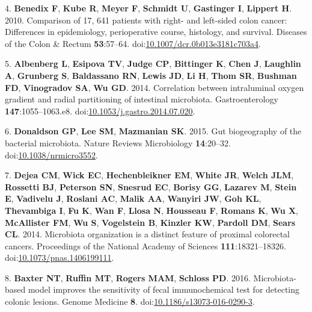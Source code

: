 \documentclass[11pt,]{article}
\begin{document}
\hypertarget{ref-Benedix2010}{}
4. \textbf{Benedix F}, \textbf{Kube R}, \textbf{Meyer F},
\textbf{Schmidt U}, \textbf{Gastinger I}, \textbf{Lippert H}. 2010.
Comparison of 17, 641 patients with right- and left-sided colon cancer:
Differences in epidemiology, perioperative course, histology, and
survival. Diseases of the Colon \& Rectum \textbf{53}:57--64.
doi:\href{https://doi.org/10.1007/dcr.0b013e3181c703a4}{10.1007/dcr.0b013e3181c703a4}.

\hypertarget{ref-Albenberg2014}{}
5. \textbf{Albenberg L}, \textbf{Esipova TV}, \textbf{Judge CP},
\textbf{Bittinger K}, \textbf{Chen J}, \textbf{Laughlin A},
\textbf{Grunberg S}, \textbf{Baldassano RN}, \textbf{Lewis JD},
\textbf{Li H}, \textbf{Thom SR}, \textbf{Bushman FD}, \textbf{Vinogradov
SA}, \textbf{Wu GD}. 2014. Correlation between intraluminal oxygen
gradient and radial partitioning of intestinal microbiota.
Gastroenterology \textbf{147}:1055--1063.e8.
doi:\href{https://doi.org/10.1053/j.gastro.2014.07.020}{10.1053/j.gastro.2014.07.020}.

\hypertarget{ref-Donaldson2015}{}
6. \textbf{Donaldson GP}, \textbf{Lee SM}, \textbf{Mazmanian SK}. 2015.
Gut biogeography of the bacterial microbiota. Nature Reviews
Microbiology \textbf{14}:20--32.
doi:\href{https://doi.org/10.1038/nrmicro3552}{10.1038/nrmicro3552}.

\hypertarget{ref-Dejea2014}{}
7. \textbf{Dejea CM}, \textbf{Wick EC}, \textbf{Hechenbleikner EM},
\textbf{White JR}, \textbf{Welch JLM}, \textbf{Rossetti BJ},
\textbf{Peterson SN}, \textbf{Snesrud EC}, \textbf{Borisy GG},
\textbf{Lazarev M}, \textbf{Stein E}, \textbf{Vadivelu J},
\textbf{Roslani AC}, \textbf{Malik AA}, \textbf{Wanyiri JW}, \textbf{Goh
KL}, \textbf{Thevambiga I}, \textbf{Fu K}, \textbf{Wan F}, \textbf{Llosa
N}, \textbf{Housseau F}, \textbf{Romans K}, \textbf{Wu X},
\textbf{McAllister FM}, \textbf{Wu S}, \textbf{Vogelstein B},
\textbf{Kinzler KW}, \textbf{Pardoll DM}, \textbf{Sears CL}. 2014.
Microbiota organization is a distinct feature of proximal colorectal
cancers. Proceedings of the National Academy of Sciences
\textbf{111}:18321--18326.
doi:\href{https://doi.org/10.1073/pnas.1406199111}{10.1073/pnas.1406199111}.

\hypertarget{ref-Baxter2016}{}
8. \textbf{Baxter NT}, \textbf{Ruffin MT}, \textbf{Rogers MAM},
\textbf{Schloss PD}. 2016. Microbiota-based model improves the
sensitivity of fecal immunochemical test for detecting colonic lesions.
Genome Medicine \textbf{8}.
doi:\href{https://doi.org/10.1186/s13073-016-0290-3}{10.1186/s13073-016-0290-3}.
\end{document}
